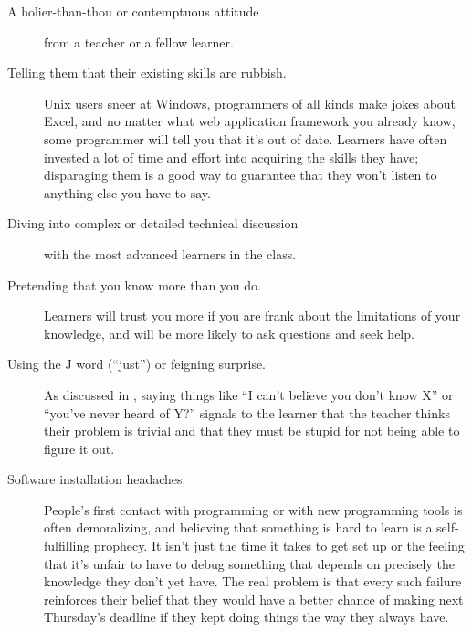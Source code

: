 \begin{description}

\item[A holier-than-thou or contemptuous attitude]
  from a teacher or a fellow learner.

\item[Telling them that their existing skills are rubbish.]
  Unix users sneer at Windows,
  programmers of all kinds make jokes about Excel,
  and no matter what web application framework you already know,
  some programmer will tell you that it's out of date.
  Learners have often invested a lot of time and effort into acquiring the skills they have;
  disparaging them is a good way to guarantee that
  they won't listen to anything else you have to say.

\item[Diving into complex or detailed technical discussion]
  with the most advanced learners in the class.

\item[Pretending that you know more than you do.]
  Learners will trust you more if you are frank about the limitations of your knowledge,
  and will be more likely to ask questions and seek help.

\item[Using the J word (``just'') or feigning surprise.]
  As discussed in ,
  saying things like ``I can't believe you don't know X'' or ``you've never heard of Y?''
  signals to the learner that
  the teacher thinks their problem is trivial
  and  that they must be stupid for not being able to figure it out.

\item[Software installation headaches.]
  People's first contact with programming or with new programming tools is often demoralizing,
  and believing that something is hard to learn is a self-fulfilling prophecy.
  It isn't just the time it takes to get set up
  or the feeling that it's unfair to have to debug something that depends on
  precisely the knowledge they don't yet have.
  The real problem is that every such failure reinforces their belief that
  they would have a better chance of making next Thursday's deadline
  if they kept doing things the way they always have.

\end{description}

